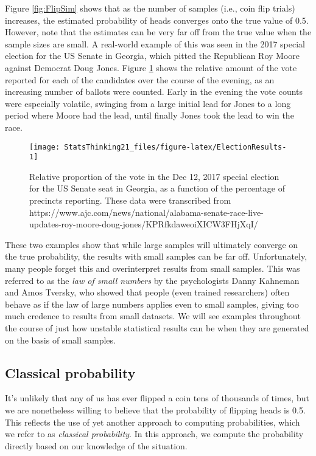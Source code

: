 \documentclass[]{book}
\theoremstyle{definition}
\theoremstyle{definition}
\theoremstyle{definition}
\theoremstyle{remark}
\begin{document}
Figure \ref{fig:FlipSim} shows that as the number of samples (i.e., coin
flip trials) increases, the estimated probability of heads converges
onto the true value of 0.5. However, note that the estimates can be very
far off from the true value when the sample sizes are small. A
real-world example of this was seen in the 2017 special election for the
US Senate in Georgia, which pitted the Republican Roy Moore against
Democrat Doug Jones. Figure \ref{fig:ElectionResults} shows the relative
amount of the vote reported for each of the candidates over the course
of the evening, as an increasing number of ballots were counted. Early
in the evening the vote counts were especially volatile, swinging from a
large initial lead for Jones to a long period where Moore had the lead,
until finally Jones took the lead to win the race.

\begin{figure}
\texttt{[image: StatsThinking21\_files/figure-latex/ElectionResults-1]} \caption{Relative proportion of the vote in the Dec 12, 2017 special election for the US Senate seat in Georgia, as a function of the percentage of precincts reporting. These data were transcribed from https://www.ajc.com/news/national/alabama-senate-race-live-updates-roy-moore-doug-jones/KPRfkdaweoiXICW3FHjXqI/}\label{fig:ElectionResults}
\end{figure}

These two examples show that while large samples will ultimately
converge on the true probability, the results with small samples can be
far off. Unfortunately, many people forget this and overinterpret
results from small samples. This was referred to as the \emph{law of
small numbers} by the psychologists Danny Kahneman and Amos Tversky, who
showed that people (even trained researchers) often behave as if the law
of large numbers applies even to small samples, giving too much credence
to results from small datasets. We will see examples throughout the
course of just how unstable statistical results can be when they are
generated on the basis of small samples.

\subsection{Classical probability}\label{classical-probability}

It's unlikely that any of us has ever flipped a coin tens of thousands
of times, but we are nonetheless willing to believe that the probability
of flipping heads is 0.5. This reflects the use of yet another approach
to computing probabilities, which we refer to as \emph{classical
probability}. In this approach, we compute the probability directly
based on our knowledge of the situation.
\end{document}
